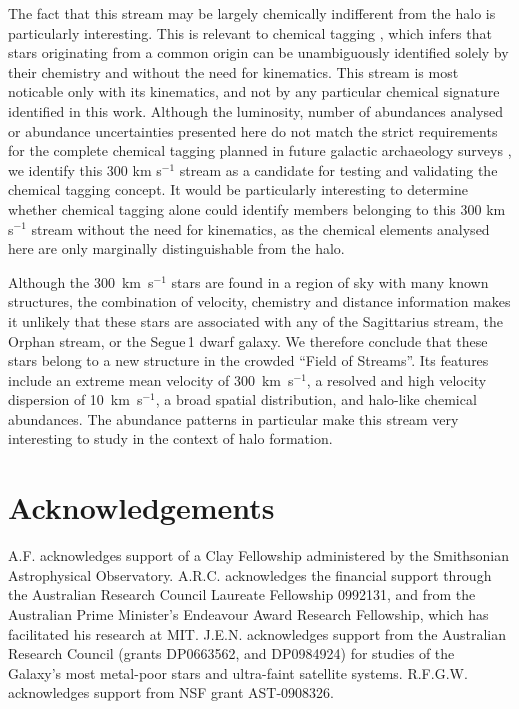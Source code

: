 \documentclass{emulateapj}
\begin{document}
The fact that this stream may be largely chemically indifferent from the halo is particularly interesting. This is relevant to chemical tagging \citep{Freeman;Bland-Hawthorn2003}, which infers that stars originating from a common origin can be unambiguously identified solely by their chemistry and without the need for kinematics. This stream is most noticable only with its kinematics, and not by any particular chemical signature identified in this work. Although the luminosity, number of abundances analysed or abundance uncertainties presented here do not match the strict requirements for the complete chemical tagging planned in future galactic archaeology surveys \citep{Ting2012}, we identify this 300 km s$^{-1}$ stream as a candidate for testing and validating the chemical tagging concept. It would be particularly interesting to determine whether chemical tagging alone could identify members belonging to this 300 km s$^{-1}$ stream without the need for kinematics, as the chemical elements analysed here are only marginally distinguishable from the halo.

Although the 300~km~s$^{-1}$ stars are found in a region of sky with many known structures, the combination of velocity, chemistry and distance information makes it unlikely that these stars are associated with any of the Sagittarius stream, the Orphan stream, or the Segue\,1 dwarf galaxy. We therefore conclude that these stars belong to a new structure in the crowded ``Field of Streams''. Its features include an extreme mean velocity of 300~km~s$^{-1}$, a resolved and high velocity dispersion of 10~km~s$^{-1}$, a broad spatial distribution, and halo-like chemical abundances. The abundance patterns in particular make this stream very interesting to study in the context of halo formation. 

 

\section{Acknowledgements}
A.F. acknowledges support of a Clay Fellowship administered by the Smithsonian Astrophysical Observatory. A.R.C. acknowledges the financial support through the Australian Research Council Laureate Fellowship 0992131, and from the Australian Prime Minister's Endeavour Award Research Fellowship, which has facilitated his research at MIT. J.E.N. acknowledges support from the Australian Research Council (grants DP0663562, and DP0984924) for studies of the Galaxy's most metal-poor stars and ultra-faint satellite systems. R.F.G.W. acknowledges support from NSF grant AST-0908326.
\end{document}
